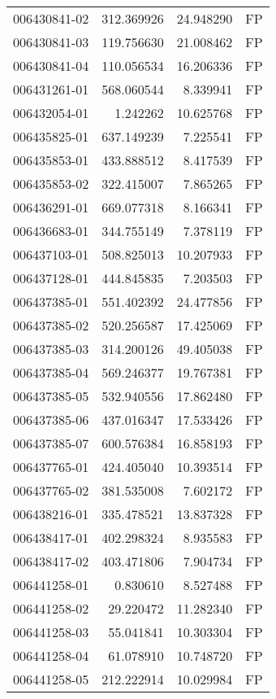 \begin{tabular}{lrrl}
006430841-02 &  312.369926 &    24.948290 &   FP \\
006430841-03 &  119.756630 &    21.008462 &   FP \\
006430841-04 &  110.056534 &    16.206336 &   FP \\
006431261-01 &  568.060544 &     8.339941 &   FP \\
006432054-01 &    1.242262 &    10.625768 &   FP \\
006435825-01 &  637.149239 &     7.225541 &   FP \\
006435853-01 &  433.888512 &     8.417539 &   FP \\
006435853-02 &  322.415007 &     7.865265 &   FP \\
006436291-01 &  669.077318 &     8.166341 &   FP \\
006436683-01 &  344.755149 &     7.378119 &   FP \\
006437103-01 &  508.825013 &    10.207933 &   FP \\
006437128-01 &  444.845835 &     7.203503 &   FP \\
006437385-01 &  551.402392 &    24.477856 &   FP \\
006437385-02 &  520.256587 &    17.425069 &   FP \\
006437385-03 &  314.200126 &    49.405038 &   FP \\
006437385-04 &  569.246377 &    19.767381 &   FP \\
006437385-05 &  532.940556 &    17.862480 &   FP \\
006437385-06 &  437.016347 &    17.533426 &   FP \\
006437385-07 &  600.576384 &    16.858193 &   FP \\
006437765-01 &  424.405040 &    10.393514 &   FP \\
006437765-02 &  381.535008 &     7.602172 &   FP \\
006438216-01 &  335.478521 &    13.837328 &   FP \\
006438417-01 &  402.298324 &     8.935583 &   FP \\
006438417-02 &  403.471806 &     7.904734 &   FP \\
006441258-01 &    0.830610 &     8.527488 &   FP \\
006441258-02 &   29.220472 &    11.282340 &   FP \\
006441258-03 &   55.041841 &    10.303304 &   FP \\
006441258-04 &   61.078910 &    10.748720 &   FP \\
006441258-05 &  212.222914 &    10.029984 &   FP \\

\end{tabular}
